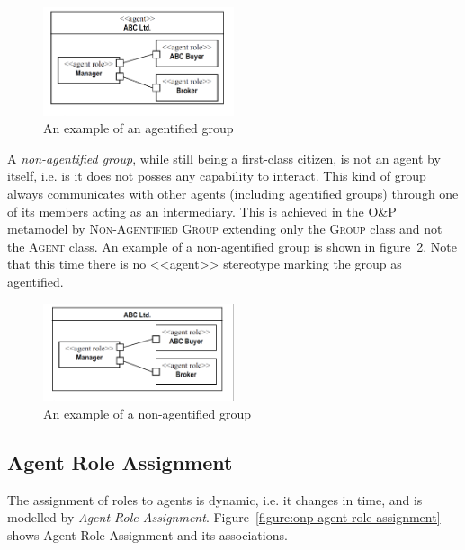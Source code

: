 \begin{figure}[ht]
	\centering
	\includegraphics[width=0.5\textwidth]{images/onp/agentified-group.png}
	\caption{An example of an agentified group}
	\label{figure:onp-agentified-group}
\end{figure}

A \textit{non-agentified group}, while still being a first-class citizen, is not an agent by itself, i.e. is it does not posses any capability to interact.
This kind of group always communicates with other agents (including agentified groups) through one of its members acting as an intermediary.
This is achieved in the O\&P metamodel by \textsc{Non-Agentified Group} extending only the \textsc{Group} class and not the \textsc{Agent} class.
An example of a non-agentified group is shown in figure~\ref{figure:onp-non-agentified-group}.
Note that this time there is no <<agent>> stereotype marking the group as agentified.

\begin{figure}[ht]
	\centering
	\includegraphics[width=0.5\textwidth]{images/onp/non-agentified-group.png}
	\caption{An example of a non-agentified group}
	\label{figure:onp-non-agentified-group}
\end{figure}

\subsection{Agent Role Assignment}

The assignment of roles to agents is dynamic, i.e. it changes in time, and is modelled by \textit{Agent Role Assignment}.
Figure~\ref{figure:onp-agent-role-assignment} shows Agent Role Assignment and its associations.  

